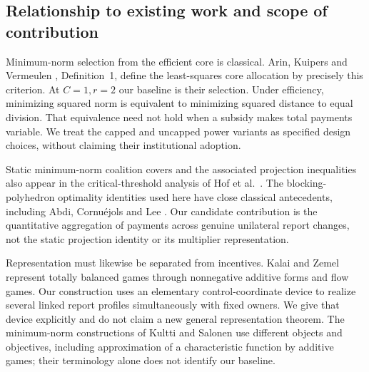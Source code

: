 \documentclass[11pt]{article}
\theoremstyle{definition}
\theoremstyle{remark}
\begin{document}
\subsection{Relationship to existing work and scope of contribution}
Minimum-norm selection from the efficient core is classical. Arin, Kuipers and
Vermeulen \cite{AKV2008}, Definition~1, define the least-squares core allocation
by precisely this criterion. At $C=1,r=2$ our baseline is their selection. Under
efficiency, minimizing squared norm is equivalent to minimizing squared distance
to equal division. That equivalence need not hold when a subsidy makes total
payments variable. We treat the capped and uncapped power variants as specified
design choices, without claiming their institutional adoption.

Static minimum-norm coalition covers and the associated projection inequalities
also appear in the critical-threshold analysis of Hof et al.\ \cite{Hof2018}.
The blocking-polyhedron optimality identities used here have close classical
antecedents, including Abdi, Cornu\'{e}jols and Lee \cite{ACL2019}. Our candidate
contribution is the quantitative aggregation of payments across genuine
unilateral report changes, not the static projection identity or its multiplier
representation.

Representation must likewise be separated from incentives. Kalai and Zemel
\cite{KZ1980} represent totally balanced games through nonnegative additive forms
and flow games. Our construction uses an elementary control-coordinate device
to realize several linked report profiles simultaneously with fixed owners.
We give that device explicitly and do not claim a new general representation
theorem. The minimum-norm constructions of Kultti and Salonen \cite{KS2005}
use different objects and objectives, including approximation of a characteristic
function by additive games; their terminology alone does not identify our baseline.
\end{document}
